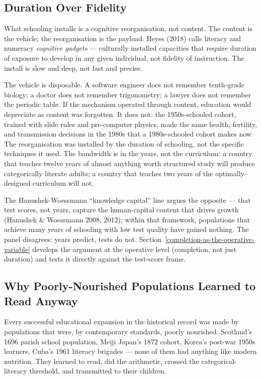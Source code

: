 \documentclass[12pt,letterpaper]{article}
\begin{document}
\subsection{Duration Over Fidelity}\label{duration-over-fidelity}

What schooling installs is a cognitive reorganisation, not content.
The content is the vehicle; the reorganisation is the payload. Heyes
(2018) calls literacy and numeracy \emph{cognitive gadgets} ---
culturally installed capacities that require duration of exposure to
develop in any given individual, not fidelity of instruction. The
install is slow and deep, not fast and precise.

The vehicle is disposable. A software engineer does not remember
tenth-grade biology; a doctor does not remember trigonometry; a
lawyer does not remember the periodic table. If the mechanism
operated through content, education would depreciate as content was
forgotten. It does not: the 1950s-schooled cohort, trained with slide
rules and pre-computer physics, made the same health, fertility, and
transmission decisions in the 1980s that a 1980s-schooled cohort
makes now. The reorganisation was installed by the duration of
schooling, not the specific techniques it used. The bandwidth is in
the years, not the curriculum: a country that teaches twelve years
of almost anything worth structured study will produce categorically
literate adults; a country that teaches two years of the
optimally-designed curriculum will not.

The Hanushek-Woessmann ``knowledge capital'' line argues the
opposite --- that test scores, not years, capture the human-capital
content that drives growth (Hanushek \& Woessmann 2008, 2012); within
that framework, populations that achieve many years of schooling with
low test quality have gained nothing. The panel disagrees: years
predict, tests do not.
Section~\ref{completion-as-the-operative-variable} develops the
argument at the operative level (completion, not just duration) and
tests it directly against the test-score frame.

\subsection{Why Poorly-Nourished Populations Learned to Read Anyway}\label{why-poorly-nourished-populations-learned-to-read}

Every successful educational expansion in the historical record was
made by populations that were, by contemporary standards, poorly
nourished. Scotland's 1696 parish school population, Meiji Japan's
1872 cohort, Korea's post-war 1950s learners, Cuba's 1961 literacy
brigades --- none of them had anything like modern nutrition. They
learned to read, did the arithmetic, crossed the categorical-literacy
threshold, and transmitted to their children.
\end{document}
